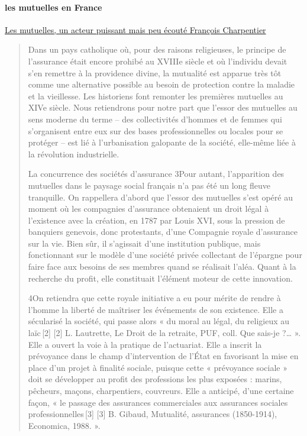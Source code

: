 \paragraph{les mutuelles en France}
\href{https://www.cairn.info/revue-les-tribunes-de-la-sante1-2016-3-page-61.htm}{Les mutuelles, un acteur puissant mais peu écouté
François Charpentier}
\begin{quote}
    Dans un pays catholique où, pour des raisons religieuses, le principe de l’assurance était encore prohibé au XVIIIe siècle et où l’individu devait s’en remettre à la providence divine, la mutualité est apparue très tôt comme une alternative possible au besoin de protection contre la maladie et la vieillesse. Les historiens font remonter les premières mutuelles au XIVe siècle. Nous retiendrons pour notre part que l’essor des mutuelles au sens moderne du terme – des collectivités d’hommes et de femmes qui s’organisent entre eux sur des bases professionnelles ou locales pour se protéger – est lié à l’urbanisation galopante de la société, elle-même liée à la révolution industrielle.

La concurrence des sociétés d’assurance
3Pour autant, l’apparition des mutuelles dans le paysage social français n’a pas été un long fleuve tranquille. On rappellera d’abord que l’essor des mutuelles s’est opéré au moment où les compagnies d’assurance obtenaient un droit légal à l’existence avec la création, en 1787 par Louis XVI, sous la pression de banquiers genevois, donc protestants, d’une Compagnie royale d’assurance sur la vie. Bien sûr, il s’agissait d’une institution publique, mais fonctionnant sur le modèle d’une société privée collectant de l’épargne pour faire face aux besoins de ses membres quand se réalisait l’aléa. Quant à la recherche du profit, elle constituait l’élément moteur de cette innovation.

4On retiendra que cette royale initiative a eu pour mérite de rendre à l’homme la liberté de maîtriser les événements de son existence. Elle a sécularisé la société, qui passe alors « du moral au légal, du religieux au laïc [2]
[2]
L. Lautrette, Le Droit de la retraite, PUF, coll. Que sais-je ?… ». Elle a ouvert la voie à la pratique de l’actuariat. Elle a inscrit la prévoyance dans le champ d’intervention de l’État en favorisant la mise en place d’un projet à finalité sociale, puisque cette « prévoyance sociale » doit se développer au profit des professions les plus exposées : marins, pêcheurs, maçons, charpentiers, couvreurs. Elle a anticipé, d’une certaine façon, « le passage des assurances commerciales aux assurances sociales professionnelles [3]
[3]
B. Gibaud, Mutualité, assurances (1850-1914), Economica, 1988. ».


\end{quote}

